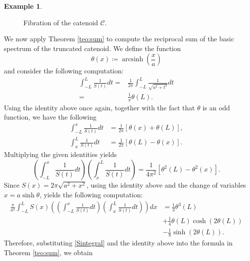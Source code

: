 \documentclass{amsart}
\theoremstyle{definition}
\newtheorem{example}[theorem]{Example}
\theoremstyle{remark}
\numberwithin{equation}{section}
\begin{document}
\begin{example}
\begin{enumerate}
\begin{figure}[htb!]
    \caption{Fibration of the catenoid $\mathcal{C}$.}
 \label{fig:catenoid}
\end{figure}
We now apply Theorem \ref{teo:sum} to compute the reciprocal sum of the basic spectrum of the truncated catenoid. We define the function 
\[ \theta(x) \coloneq \operatorname{arcsinh}{\left( \frac{x}{a} \right)}\]
and consider the following computation:
\begin{equation*}
 \begin{aligned}\label{Sintegral}
 \int_{-L}^L \frac{1}{S(t)}dt =& \frac{1}{2\pi}\int_{-L}^{L} \frac{1}{\sqrt{a^2 + t^2}} dt \\
 =& \frac{1}{\pi } \theta(L).
 \end{aligned}
\end{equation*}
Using the identity above once again, together with the fact that $\theta$ is an odd function, we have the following
\begin{equation*}
\begin{aligned}\label{integral}
 \int_{-L}^x \frac{1}{S(t)}dt &= \frac{1}{2\pi} \left[ \theta(x) + \theta(L) \right], \\
\int_{x}^{L} \frac{1}{S(t)}dt &= \frac{1}{2\pi} \left[ \theta(L) - \theta(x) \right]. 
\end{aligned}
\end{equation*}
Multiplying the given identities yields 
\[ \left( \int_{-L}^x \frac{1}{S(t)}dt \right) \left( \int_{x}^{L} \frac{1}{S(t)}dt \right) = \frac{1}{4\pi^2} \left[ \theta^2(L) - \theta^2(x) \right].\]
Since $S(x)=2\pi\sqrt{a^2+x^2}$, using the identity above and the change of variables $x=a\sinh\theta$, yields the following computation: 
\begin{equation*}
\begin{aligned}\label{SP}
     \frac{\pi}{a^2}\int_{-L}^LS(x) \left( \left( \int_{-L}^x \frac{1}{S(t)}dt \right) \left( \int_{x}^{L} \frac{1}{S(t)}dt \right) \right)dx &= \frac{1}{3}\theta^3(L)\\ &+ \frac{1}{4}\theta(L)\cosh{\left( 2 \theta(L) \right)} \\
     &-\frac{1}{8}\sinh{\left( 2\theta(L) \right)}.
\end{aligned}
\end{equation*}
Therefore, substituting \eqref{Sintegral} and the identity above into the formula in Theorem \ref{teo:sum}, we obtain

\end{enumerate}
\end{example}
\end{document}
